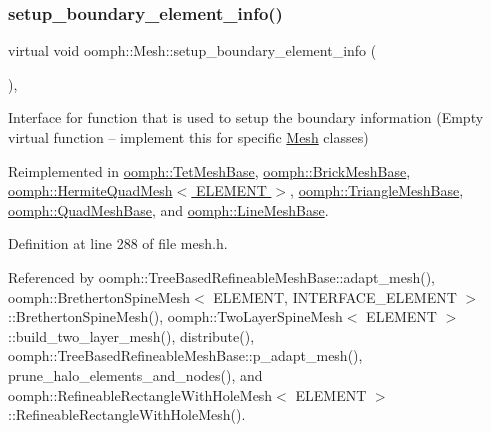 \mbox{\label{classoomph_1_1Mesh_a6cc8bcd6b41209f0e9295cc993d9c6bb}} 
\subsubsection{\texorpdfstring{setup\+\_\+boundary\+\_\+element\+\_\+info()}{setup\_boundary\_element\_info()}\hspace{0.1cm}{\footnotesize\ttfamily [1/2]}}
{\footnotesize\ttfamily virtual void oomph\+::\+Mesh\+::setup\+\_\+boundary\+\_\+element\+\_\+info (\begin{DoxyParamCaption}{ }\end{DoxyParamCaption})\hspace{0.3cm}{\ttfamily [inline]}, {\ttfamily [virtual]}}



Interface for function that is used to setup the boundary information (Empty virtual function -- implement this for specific \hyperlink{classoomph_1_1Mesh}{Mesh} classes) 



Reimplemented in \hyperlink{classoomph_1_1TetMeshBase_ac372c93f2834c864f7376f1aceda718f}{oomph\+::\+Tet\+Mesh\+Base}, \hyperlink{classoomph_1_1BrickMeshBase_aa2d28d573a5dadd0ddef912e2a2c6828}{oomph\+::\+Brick\+Mesh\+Base}, \hyperlink{classoomph_1_1HermiteQuadMesh_a6eefe872b5bf8a06174b536d9727ea44}{oomph\+::\+Hermite\+Quad\+Mesh$<$ E\+L\+E\+M\+E\+N\+T $>$}, \hyperlink{classoomph_1_1TriangleMeshBase_aa78fe0d750c842df53e1fa2237205e51}{oomph\+::\+Triangle\+Mesh\+Base}, \hyperlink{classoomph_1_1QuadMeshBase_ad1e5291285fbf34c62cbd45156dded2d}{oomph\+::\+Quad\+Mesh\+Base}, and \hyperlink{classoomph_1_1LineMeshBase_ac630cc88daeec61aff7335c2b1d77d91}{oomph\+::\+Line\+Mesh\+Base}.



Definition at line 288 of file mesh.\+h.



Referenced by oomph\+::\+Tree\+Based\+Refineable\+Mesh\+Base\+::adapt\+\_\+mesh(), oomph\+::\+Bretherton\+Spine\+Mesh$<$ E\+L\+E\+M\+E\+N\+T, I\+N\+T\+E\+R\+F\+A\+C\+E\+\_\+\+E\+L\+E\+M\+E\+N\+T $>$\+::\+Bretherton\+Spine\+Mesh(), oomph\+::\+Two\+Layer\+Spine\+Mesh$<$ E\+L\+E\+M\+E\+N\+T $>$\+::build\+\_\+two\+\_\+layer\+\_\+mesh(), distribute(), oomph\+::\+Tree\+Based\+Refineable\+Mesh\+Base\+::p\+\_\+adapt\+\_\+mesh(), prune\+\_\+halo\+\_\+elements\+\_\+and\+\_\+nodes(), and oomph\+::\+Refineable\+Rectangle\+With\+Hole\+Mesh$<$ E\+L\+E\+M\+E\+N\+T $>$\+::\+Refineable\+Rectangle\+With\+Hole\+Mesh().


